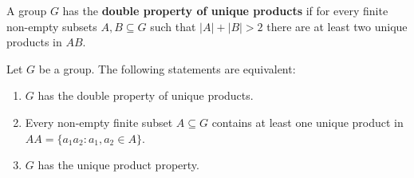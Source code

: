 
\begin{definition}
	A group $G$ has the \textbf{double property of unique products} 
	if for every finite non-empty subsets $A,B\subseteq G$ such that 
	$|A|+|B|>2$ there are at least two unique products in $AB$.
\end{definition}

\begin{theorem}[Strojnowski]
	\label{theorem:Strojnowski}
	Let $G$ be a group. The following statements are equivalent:
	\begin{enumerate}
		\item $G$ has the double property of unique products. 
		\item Every non-empty finite subset $A\subseteq G$ contains at least one unique product 
			in $AA=\{a_1a_2:a_1,a_2\in A\}$.
		\item $G$ has the unique product property.
	\end{enumerate}
\end{theorem}

